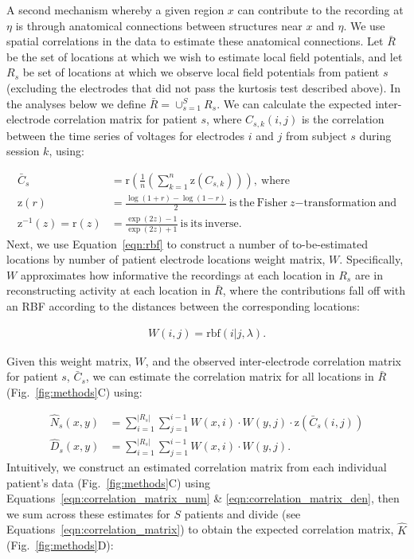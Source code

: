 \documentclass[12pt]{article}
\begin{document}
A second mechanism whereby a given region $x$ can contribute to the
recording at $\eta$ is through anatomical connections between
structures near $x$ and $\eta$.  We use spatial correlations in the
data to estimate these anatomical connections.  Let $\bar{R}$ be the
set of locations at which we wish to estimate local field potentials,
and let $R_{s}$ be set of locations at which we observe local field
potentials from patient $s$ (excluding the electrodes that did not
pass the kurtosis test described above). In the analyses below we
define $\bar{R} = \cup_{s=1}^S R_s$.  We can calculate the expected
inter-electrode correlation matrix for patient $s$, where
$C_{s,k}(i,j)$ is the correlation between the time series of voltages
for electrodes $i$ and $j$ from subject $s$ during session $k$, using:

\begin{align}
  \bar{C}_{s} &=
  \mathrm{r}(\frac{1}{n}(\sum_{k=1}^{n}\mathrm{z}(C_{s,k}))),\label{eqn:inter_corr}~\mathrm{where}\\
\mathrm{z}(r) &= \frac{\log(1+r) - \log(1 - r)}{2}~\mathrm{is~the~Fisher}~z \mathrm{-transformation~and}\label{eqn:fishersz}\\
\mathrm{z}^{-1}(z) = \mathrm{r}(z) &= \frac{\exp(2z) - 1}{\exp(2z) + 1}\mathrm{~is~its~inverse}.\label{eqn:invfishersz}
\end{align}
Next, we use Equation~\ref{eqn:rbf} to construct a number of
to-be-estimated locations by number of patient electrode locations
weight matrix, $W$.  Specifically, $W$ approximates how informative the
recordings at each location in $R_s$ are in reconstructing activity at
each location in $\bar{R}$, where the contributions fall off with an RBF according to
the distances between the corresponding locations:

\begin{align}
W(i, j) = \mathrm{rbf}(i|j,\lambda)\label{eqn:weight_matrix}.
\end{align}

Given this weight matrix, $W$,
and the observed inter-electrode correlation matrix for patient $s$,
$\bar{C}_{s}$, we can estimate the correlation matrix for all locations in
$\bar{R}$ (Fig.~\ref{fig:methods}C) using:

\begin{align}
\hat{N}_{s}(x,y) & = { \sum_{i = 1}^{| R_{s}|}\sum_{j=1}^{i-1} W(x,i) \cdot W(y,j)\cdot \mathrm{z}(\bar{C}_{s}(i,j))}\label{eqn:correlation_matrix_num}\\
 \hat{D}_{s}(x,y) & = \sum_{i = 1}^{| R_{s}|}\sum_{j=1}^{i-1} W(x,i) \cdot W(y,j). \label{eqn:correlation_matrix_den}
\end{align}
Intuitively, we construct an estimated correlation matrix from each
individual patient's data (Fig.~\ref{fig:methods}C) using
Equations~\ref{eqn:correlation_matrix_num} \& \ref{eqn:correlation_matrix_den}, then we sum across these estimates for $S$ patients and divide (see Equations~\ref{eqn:correlation_matrix}) to obtain the expected correlation
matrix, $\hat{K}$ (Fig.~\ref{fig:methods}D):
\end{document}

